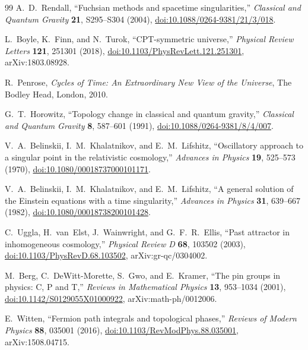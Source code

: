 \documentclass[11pt]{article}
\theoremstyle{canonmath}
\theoremstyle{canonpostulate}
\theoremstyle{canonproposition}
\theoremstyle{canonmath}
\theoremstyle{canonproposition}
\begin{document}
\begin{thebibliography}{99}
A.~D.~Rendall, ``Fuchsian methods and spacetime singularities,'' \textit{Classical and Quantum Gravity} \textbf{21}, S295--S304 (2004), \href{https://doi.org/10.1088/0264-9381/21/3/018}{doi:10.1088/0264-9381/21/3/018}.

L.~Boyle, K.~Finn, and N.~Turok, ``CPT-symmetric universe,'' \textit{Physical Review Letters} \textbf{121}, 251301 (2018), \href{https://doi.org/10.1103/PhysRevLett.121.251301}{doi:10.1103/PhysRevLett.121.251301}, arXiv:1803.08928.

R.~Penrose, \textit{Cycles of Time: An Extraordinary New View of the Universe}, The Bodley Head, London, 2010.

G.~T.~Horowitz, ``Topology change in classical and quantum gravity,'' \textit{Classical and Quantum Gravity} \textbf{8}, 587--601 (1991), \href{https://doi.org/10.1088/0264-9381/8/4/007}{doi:10.1088/0264-9381/8/4/007}.

V.~A.~Belinskii, I.~M.~Khalatnikov, and E.~M.~Lifshitz, ``Oscillatory approach to a singular point in the relativistic cosmology,'' \textit{Advances in Physics} \textbf{19}, 525--573 (1970), \href{https://doi.org/10.1080/00018737000101171}{doi:10.1080/00018737000101171}.

V.~A.~Belinskii, I.~M.~Khalatnikov, and E.~M.~Lifshitz, ``A general solution of the Einstein equations with a time singularity,'' \textit{Advances in Physics} \textbf{31}, 639--667 (1982), \href{https://doi.org/10.1080/00018738200101428}{doi:10.1080/00018738200101428}.

C.~Uggla, H.~van~Elst, J.~Wainwright, and G.~F.~R.~Ellis, ``Past attractor in inhomogeneous cosmology,'' \textit{Physical Review D} \textbf{68}, 103502 (2003), \href{https://doi.org/10.1103/PhysRevD.68.103502}{doi:10.1103/PhysRevD.68.103502}, arXiv:gr-qc/0304002.

M.~Berg, C.~DeWitt-Morette, S.~Gwo, and E.~Kramer, ``The pin groups in physics: C, P and T,'' \textit{Reviews in Mathematical Physics} \textbf{13}, 953--1034 (2001), \href{https://doi.org/10.1142/S0129055X01000922}{doi:10.1142/S0129055X01000922}, arXiv:math-ph/0012006.

E.~Witten, ``Fermion path integrals and topological phases,'' \textit{Reviews of Modern Physics} \textbf{88}, 035001 (2016), \href{https://doi.org/10.1103/RevModPhys.88.035001}{doi:10.1103/RevModPhys.88.035001}, arXiv:1508.04715.


\end{thebibliography}
\end{document}

